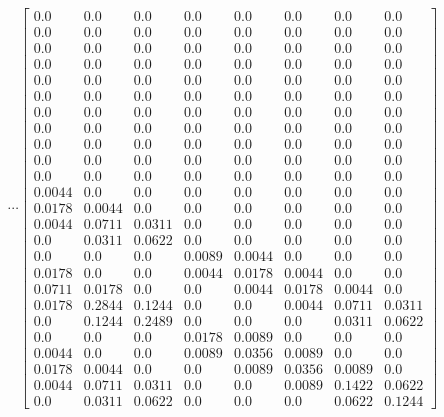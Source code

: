 \documentclass[12pt]{article}
\begin{document}
\[\cdots \left[\begin{matrix}0.0 & 0.0 & 0.0 & 0.0 & 0.0 & 0.0 & 0.0 & 0.0\\0.0 & 0.0 & 0.0 & 0.0 & 0.0 & 0.0 & 0.0 & 0.0\\0.0 & 0.0 & 0.0 & 0.0 & 0.0 & 0.0 & 0.0 & 0.0\\0.0 & 0.0 & 0.0 & 0.0 & 0.0 & 0.0 & 0.0 & 0.0\\0.0 & 0.0 & 0.0 & 0.0 & 0.0 & 0.0 & 0.0 & 0.0\\0.0 & 0.0 & 0.0 & 0.0 & 0.0 & 0.0 & 0.0 & 0.0\\0.0 & 0.0 & 0.0 & 0.0 & 0.0 & 0.0 & 0.0 & 0.0\\0.0 & 0.0 & 0.0 & 0.0 & 0.0 & 0.0 & 0.0 & 0.0\\0.0 & 0.0 & 0.0 & 0.0 & 0.0 & 0.0 & 0.0 & 0.0\\0.0 & 0.0 & 0.0 & 0.0 & 0.0 & 0.0 & 0.0 & 0.0\\0.0 & 0.0 & 0.0 & 0.0 & 0.0 & 0.0 & 0.0 & 0.0\\0.0044 & 0.0 & 0.0 & 0.0 & 0.0 & 0.0 & 0.0 & 0.0\\0.0178 & 0.0044 & 0.0 & 0.0 & 0.0 & 0.0 & 0.0 & 0.0\\0.0044 & 0.0711 & 0.0311 & 0.0 & 0.0 & 0.0 & 0.0 & 0.0\\0.0 & 0.0311 & 0.0622 & 0.0 & 0.0 & 0.0 & 0.0 & 0.0\\0.0 & 0.0 & 0.0 & 0.0089 & 0.0044 & 0.0 & 0.0 & 0.0\\0.0178 & 0.0 & 0.0 & 0.0044 & 0.0178 & 0.0044 & 0.0 & 0.0\\0.0711 & 0.0178 & 0.0 & 0.0 & 0.0044 & 0.0178 & 0.0044 & 0.0\\0.0178 & 0.2844 & 0.1244 & 0.0 & 0.0 & 0.0044 & 0.0711 & 0.0311\\0.0 & 0.1244 & 0.2489 & 0.0 & 0.0 & 0.0 & 0.0311 & 0.0622\\0.0 & 0.0 & 0.0 & 0.0178 & 0.0089 & 0.0 & 0.0 & 0.0\\0.0044 & 0.0 & 0.0 & 0.0089 & 0.0356 & 0.0089 & 0.0 & 0.0\\0.0178 & 0.0044 & 0.0 & 0.0 & 0.0089 & 0.0356 & 0.0089 & 0.0\\0.0044 & 0.0711 & 0.0311 & 0.0 & 0.0 & 0.0089 & 0.1422 & 0.0622\\0.0 & 0.0311 & 0.0622 & 0.0 & 0.0 & 0.0 & 0.0622 & 0.1244\end{matrix}\right]\]

\newpage
\end{document}
